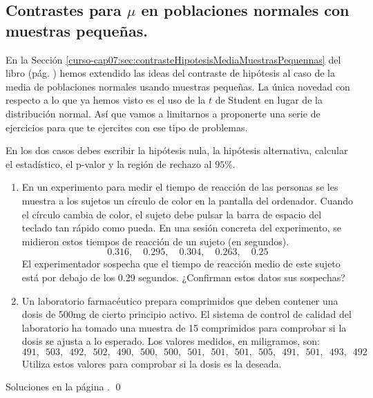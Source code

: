 \documentclass[10pt,a4paper]{article}\usepackage[]{graphicx}\usepackage[]{color}
\newcounter {cont01}
\begin{document}

\subsection{Contrastes para $\mu$ en poblaciones normales con muestras pequeñas.}
\label{tut07:subsec:ContrastesMuestrasPequennas}

En la Sección \ref{curso-cap07:sec:contrasteHipotesisMediaMuestrasPequennas} del libro (pág. \pageref{curso-cap07:sec:contrasteHipotesisMediaMuestrasPequennas}) hemos extendido las ideas del contraste de hipótesis al caso de la media de poblaciones normales usando muestras pequeñas. La única novedad con respecto a lo que ya hemos visto es el uso de la $t$ de Student en lugar de la distribución normal. Así que vamos a limitarnos a proponerte una serie de ejercicios para que te ejercites con ese tipo de problemas.

\begin{ejercicio}
\label{tut07:ejercicio09}
En los dos casos debes escribir la hipótesis nula, la hipótesis alternativa, calcular el estadístico,  el p-valor y la región de rechazo al $95\%$.
\begin{enumerate}
  \item En un experimento para medir el tiempo de reacción de las personas se les muestra a los sujetos un círculo de color en la pantalla del ordenador. Cuando el círculo cambia de color, el sujeto debe pulsar la barra de espacio del teclado tan rápido como pueda. En una sesión concreta del experimento, se midieron estos tiempos de reacción de un sujeto (en segundos).
      \[0.316,\quad 0.295,\quad 0.304,\quad 0.263,\quad 0.25\]
      El experimentador sospecha que el tiempo de reacción medio de este sujeto está por debajo de los 0.29 segundos. ¿Confirman estos datos sus sospechas?
  \item Un laboratorio farmacéutico prepara comprimidos que deben contener una dosis de 500mg de cierto principio activo. El sistema de control de calidad del laboratorio ha tomado una muestra de 15 comprimidos para comprobar si la dosis se ajusta a lo esperado. Los valores medidos, en miligramos, son:
        \[
491,\,\,\, 503,\,\,\, 492,\,\,\, 502,\,\,\, 490,\,\,\, 500,\,\,\, 500,\,\,\, 501,\,\,\, 501,\,\,\, 501,\,\,\, 505,\,\,\, 491,\,\,\, 501,\,\,\, 493,\,\,\, 492
        \]
      Utiliza estos valores para comprobar si la dosis es la deseada.
\end{enumerate}
Soluciones en la página \pageref{tut07:ejercicio09:sol}.
\qed
\end{ejercicio}
\end{document}
